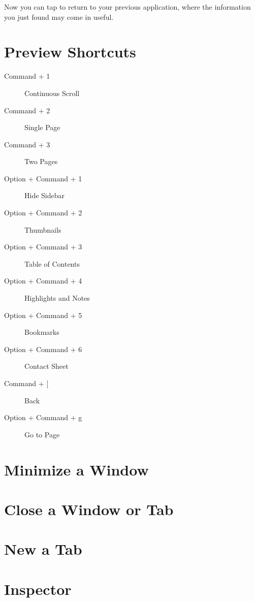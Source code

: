 Now you can tap  to return to your previous application, where the information you just found may come in useful.


\section{Preview Shortcuts}

\begin{description}
\item[Command + 1] Continuous Scroll
\item[Command + 2] Single Page
\item[Command + 3] Two Pages
\item[Option + Command + 1] Hide Sidebar
\item[Option + Command + 2] Thumbnails
\item[Option + Command + 3] Table of Contents
\item[Option + Command + 4] Highlights and Notes
\item[Option + Command + 5] Bookmarks
\item[Option + Command + 6] Contact Sheet
\item[Command + [] Back
\item[Option + Command + g] Go to Page
\end{description}

\section{Minimize a Window}


\section{Close a Window or Tab}


\section{New a Tab}


\section{Inspector}

